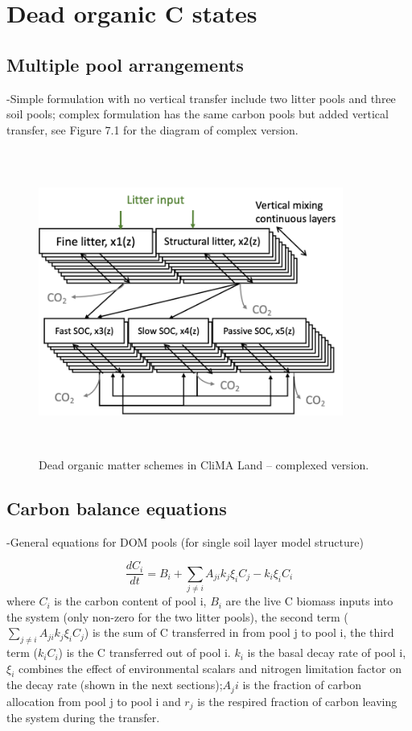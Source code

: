 \documentclass[twoside,10pt]{report}
\begin{document}
\section{Dead organic C states}

\subsection{Multiple pool arrangements}

-Simple formulation with no vertical transfer include two litter pools and three soil pools; complex formulation has the same carbon pools but added vertical transfer, see Figure 7.1 for the diagram of complex version.

\begin{figure}[htb]
\includegraphics[width=10cm,height=10cm,keepaspectratio]{CLIMA-land/LM_figures/CLIMA_DOM_complexv2.png}
\caption{Dead organic matter schemes in CliMA Land – complexed version.}
\label{f:Dead organic matter schemes in CliMA Land – complexed version.}
\end{figure}

\subsection{Carbon balance equations}

-General equations for DOM pools (for single soil layer model structure)

\begin{equation}
\frac{dC_{i}}{dt} = B_i + \sum_{j\neq i}A_{ji}k_j\xi_iC_j - k_i\xi_iC_i
\end{equation}
    where $C_i$ is the carbon content of pool i, $B_i$ are the live C biomass inputs into the system (only non-zero for the two litter pools), the second term ($\sum_{j\neq i}A_{ji}k_j\xi_iC_j$) is the sum of C transferred in from pool j to pool i, the third term ($k_iC_i$) is the C transferred out of pool i. $k_i$ is the basal decay rate of pool i, $\xi_i$ combines the effect of environmental scalars and nitrogen limitation factor on the decay rate (shown in the next sections);$A_ji$ is the fraction of carbon allocation from pool j to pool i and $r_j$ is the respired fraction of carbon leaving the system during the transfer.
\end{document}
